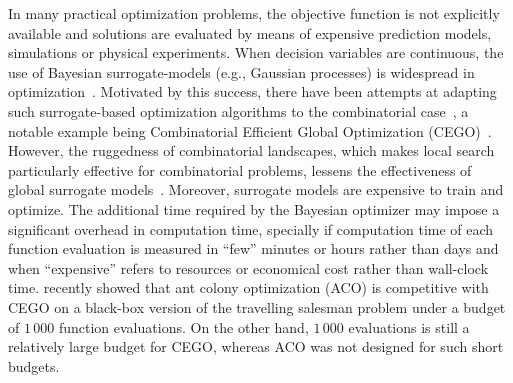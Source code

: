 \documentclass[sigconf,dvipsnames]{acmart}
\begin{document}
In many practical optimization problems, the objective function is not
explicitly available and solutions are evaluated by means of expensive
prediction models, simulations or physical experiments. When decision variables
are continuous, the use of Bayesian surrogate-models (e.g., Gaussian processes)
is widespread in
optimization~\citep{JonSchWel98go,ForKea2009surrogate}. Motivated by this
success, there have been attempts at adapting such surrogate-based optimization
algorithms to the combinatorial case~\cite{MorKat2011:evo}, a notable example being Combinatorial
Efficient Global Optimization
(CEGO)~\citep{ZaeStoBar2014:ppsn,ZaeStoFriFisNauBar2014}. However, the
ruggedness of combinatorial landscapes, which makes local search particularly
effective for combinatorial problems, lessens the effectiveness of global
surrogate models~\citep{EriPeaGar2019scalable}. Moreover, surrogate models are
expensive to train and optimize. The additional time required by the Bayesian
optimizer may impose a significant overhead in computation time, specially if
computation time of each function evaluation is measured in ``few'' minutes or
hours rather than days and when ``expensive'' refers to resources or economical
cost rather than wall-clock time. \citet{PerLopStu2015si} recently showed that
ant colony optimization (ACO) %
is competitive with CEGO
on a black-box version of the travelling salesman problem under a budget of
$1\,000$ function evaluations.  On the other hand, $1\,000$ evaluations is
still a relatively large budget for CEGO, whereas ACO was not designed for such
short budgets.
\end{document}
